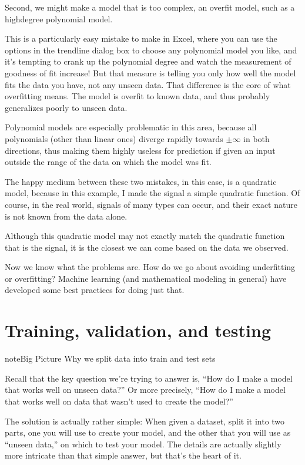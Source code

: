 \documentclass[letterpaper,10pt,english]{jupyterBook}
\begin{document}
\sphinxAtStartPar
Second, we might make a model that is too complex, an overfit model, such as a high\sphinxhyphen{}degree polynomial model.

\sphinxAtStartPar
{}

\sphinxAtStartPar
This is a particularly easy mistake to make in Excel, where you can use the options in the trendline dialog box to choose any polynomial model you like, and it’s tempting to crank up the polynomial degree and watch the measurement of goodness of fit increase!  But that measure is telling you only how well the model fits the data you have, not any unseen data.  That difference is the core of what overfitting means.  The model is overfit to known data, and thus probably generalizes poorly to unseen data.

\sphinxAtStartPar
Polynomial models are especially problematic in this area, because all polynomials (other than linear ones) diverge rapidly towards \(\pm\infty\) in both directions, thus making them highly useless for prediction if given an input outside the range of the data on which the model was fit.

\sphinxAtStartPar
The happy medium between these two mistakes, in this case, is a quadratic model, because in this example, I made the signal a simple quadratic function.  Of course, in the real world, signals of many types can occur, and their exact nature is not known from the data alone.

\sphinxAtStartPar
{}

\sphinxAtStartPar
Although this quadratic model may not exactly match the quadratic function that is the signal, it is the closest we can come based on the data we observed.

\sphinxAtStartPar
Now we know what the problems are.  How do we go about avoiding underfitting or overfitting?  Machine learning (and mathematical modeling in general) have developed some best practices for doing just that.


\section{Training, validation, and testing}
\label{\detokenize{chapter-17-machine-learning:training-validation-and-testing}}
\begin{sphinxadmonition}{note}{Big Picture \sphinxhyphen{} Why we split data into train and test sets}

\sphinxAtStartPar
Recall that the key question we’re trying to answer is, “How do I make a model that works well on unseen data?”  Or more precisely, “How do I make a model that works well on data that wasn’t used to create the model?”

\sphinxAtStartPar
The solution is actually rather simple:  When given a dataset, split it into two parts, one you will use to create your model, and the other that you will use as “unseen data,” on which to test your model.  The details are actually slightly more intricate than that simple answer, but that’s the heart of it.
\end{sphinxadmonition}
\end{document}
